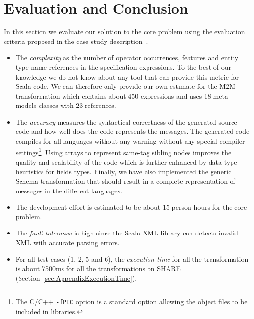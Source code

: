 \vspace*{-5mm}
\section{Evaluation and Conclusion}
\label{sec:EvaluationConclusion}

\enlargethispage{30mm}

In this section we evaluate our solution to the core problem using the evaluation criteria proposed in the case study description~\cite{Lano2014}.

\begin{itemize}[-]
  \item The \emph{complexity} as the number of operator occurrences, features and entity type name references in the specification expressions.
  To the best of our knowledge we do not know about any tool that can provide this metric for Scala code.
  We can therefore only provide our own estimate for the M2M transformation which contains about 450 expressions and uses 18 meta-models classes with 23 references.

  \item The \emph{accuracy} measures the syntactical correctness of the generated source code and how well does the code represents the \FIXML messages.
  The generated code compiles for all languages without any warning without any special compiler settings\footnote{The C/C++ \texttt{-fPIC} option is a standard option allowing the object files to be included in libraries.}.
  Using arrays to represent same-tag sibling nodes improves the quality and scalability of the code which is further enhanced by data type heuristics for fields types.
  Finally, we have also implemented the generic \FIXML Schema transformation that should result in a complete representation of \FIXML messages in the different languages.

  \item The development effort is estimated to be about 15 person-hours for the core problem.

  \item The \emph{fault tolerance} is high since the Scala XML library can detects invalid XML with accurate parsing errors.

  \item For all test cases (1, 2, 5 and 6), the \emph{execution time} for all the transformation is about 7500ms for all the transformations on SHARE (\Cf Section~\ref{sec:AppendixExecutionTime}).


\end{itemize}
